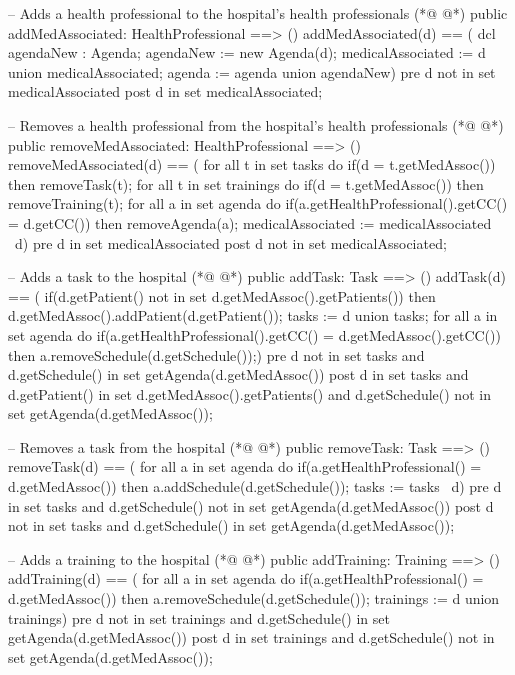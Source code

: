 \begin{vdmpp}[breaklines=true]
 -- Adds a health professional to the hospital's health professionals
(*@
\label{addMedAssociated:59}
@*)
 public addMedAssociated: HealthProfessional ==> ()
  addMedAssociated(d) == (
   dcl agendaNew : Agenda;
   agendaNew := new Agenda(d);
   medicalAssociated := {d} union medicalAssociated;
   agenda := agenda union {agendaNew})
 pre d not in set medicalAssociated
 post d in set medicalAssociated;
 
 -- Removes a health professional from the hospital's health professionals
(*@
\label{removeMedAssociated:69}
@*)
 public removeMedAssociated: HealthProfessional ==> ()
  removeMedAssociated(d) == (
   for all t in set tasks do
    if(d = t.getMedAssoc())
     then removeTask(t);
   for all t in set trainings do
    if(d = t.getMedAssoc())
     then removeTraining(t);
   for all a in set agenda do
    if(a.getHealthProfessional().getCC() = d.getCC())
     then removeAgenda(a);
   medicalAssociated := medicalAssociated \ {d})
 pre d in set medicalAssociated
 post d not in set medicalAssociated;
 
 -- Adds a task to the hospital
(*@
\label{addTask:85}
@*)
 public addTask: Task ==> ()
  addTask(d) == (
   if(d.getPatient() not in set d.getMedAssoc().getPatients())
    then d.getMedAssoc().addPatient(d.getPatient());
   tasks := {d} union tasks;
   for all a in set agenda do
    if(a.getHealthProfessional().getCC() = d.getMedAssoc().getCC())
      then a.removeSchedule(d.getSchedule());)
 pre d not in set tasks and d.getSchedule() in set getAgenda(d.getMedAssoc())
 post d in set tasks and d.getPatient() in set d.getMedAssoc().getPatients() and d.getSchedule() not in set getAgenda(d.getMedAssoc());
  
 -- Removes a task from the hospital
(*@
\label{removeTask:97}
@*)
 public removeTask: Task ==> ()
  removeTask(d) == (
   for all a in set agenda do
    if(a.getHealthProfessional() = d.getMedAssoc())
      then a.addSchedule(d.getSchedule());
   tasks := tasks \ {d})
 pre d in set tasks and d.getSchedule() not in set getAgenda(d.getMedAssoc())
 post d not in set tasks and d.getSchedule() in set getAgenda(d.getMedAssoc());
 
 -- Adds a training to the hospital
(*@
\label{addTraining:107}
@*)
 public addTraining: Training ==> ()
  addTraining(d) == (
   for all a in set agenda do
    if(a.getHealthProfessional() = d.getMedAssoc())
      then a.removeSchedule(d.getSchedule());
   trainings := {d} union trainings)
 pre d not in set trainings and d.getSchedule() in set getAgenda(d.getMedAssoc())
 post d in set trainings and d.getSchedule() not in set getAgenda(d.getMedAssoc());
 

\end{vdmpp}
